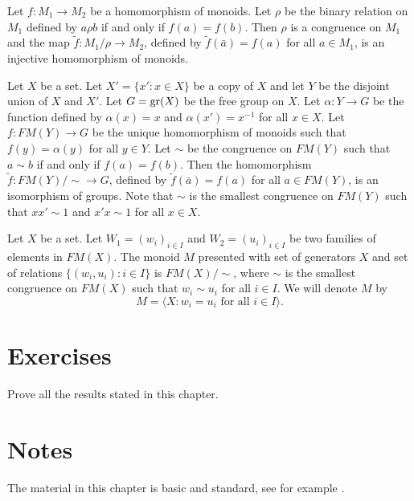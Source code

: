\begin{example}
Let $f\colon M_1\rightarrow M_2$ be a homomorphism of monoids. Let $\rho$ be the binary relation on $M_1$ defined by
$a\rho b$ if and only if $f(a)=f(b)$. Then $\rho$ is a congruence on $M_1$ and the map $\tilde f\colon M_1/\rho\rightarrow M_2$, defined by $\tilde f(\bar a)=f(a)$ for all $a\in M_1$, is an injective homomorphism of monoids.
\end{example}

\begin{example}
Let $X$ be a set. Let $X'=\{ x' : x\in X\}$ be a copy of $X$ and let $Y$ be the disjoint union of $X$ and $X'$. Let $G=\operatorname{gr}(X)$ be the free group on $X$. Let $\alpha\colon Y\rightarrow G$ be the function defined by $\alpha(x)=x$ and $\alpha(x')=x^{-1}$ for all $x\in X$. Let $f\colon FM(Y)\rightarrow G$ be the unique homomorphism of monoids such that $f(y)=\alpha(y)$ for all $y\in Y$. Let $\sim$ be the congruence on $FM(Y)$ such that $a\sim b$ if and only if $f(a)=f(b)$. Then the homomorphism $\tilde f\colon FM(Y)/\sim\rightarrow G$, defined by $\tilde f(\bar a)=f(a)$ for all $a\in FM(Y)$, is an isomorphism of groups. Note that $\sim$ is the smallest congruence on $FM(Y)$ such that $xx'\sim 1$ and $x'x\sim 1$ for all $x\in X$. 
\end{example}

Let $X$ be a set. Let $W_1=(w_i)_{i\in I}$ and $W_2=(u_i)_{i\in I}$ be two families of elements in $FM(X)$. The monoid $M$ presented with set of generators $X$ and set of relations $\{(w_i,u_i) : i\in I\}$ is $FM(X)/\sim$, where $\sim$ is the smallest congruence on $FM(X)$ such that $w_i\sim u_i$ for all $i\in I$. We will denote $M$ by
\[ M=\langle X : w_i=u_i\text{ for all }i\in I\rangle.\]

\section{Exercises}

\begin{prob} 
    Prove all the results stated in this chapter.
\end{prob}

\section{Notes}

The material in this chapter is basic and standard, see for example \cite{Cohn}.
